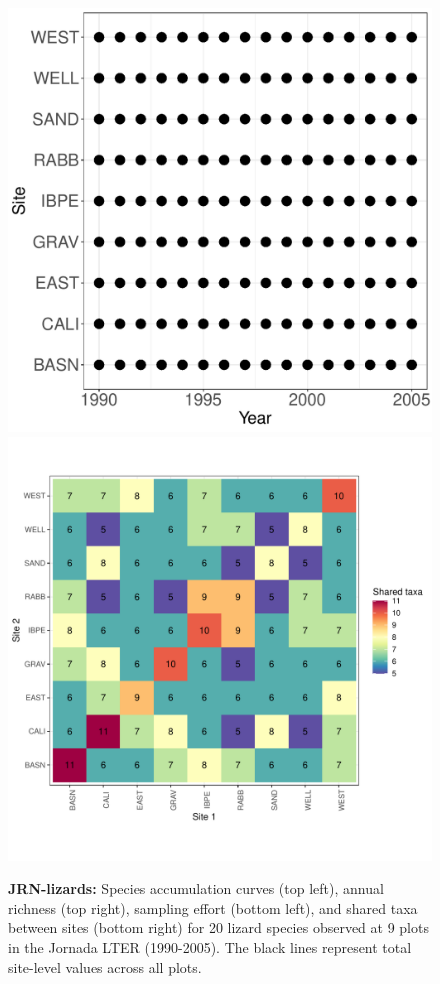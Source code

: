 \documentclass[11pt, oneside]{article}
\begin{document}
\begin{figure}[h!]
\includegraphics[scale = 0.4]{jrn-lizards-hope_spatiotemporal_sampling_effort.pdf}
\includegraphics[scale = 0.4]{jrn-lizards-hope_spp_shared.pdf}
\caption{{\bf JRN-lizards:} Species accumulation curves (top left),  annual richness (top right), sampling effort (bottom left), and shared taxa between sites (bottom right) for 20 lizard species observed at 9 plots in the Jornada LTER (1990-2005). The black lines represent total site-level values across all plots.}
\label{jrn-lizards}
\end{figure}
\end{document}
